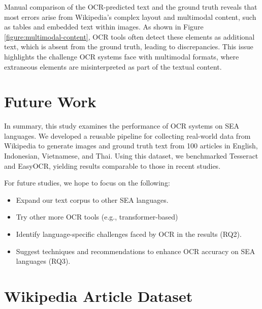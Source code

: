 \documentclass[12pt,oneside]{memoir}
\begin{document}
Manual comparison of the OCR-predicted text and the ground truth reveals that most 
errors arise from Wikipedia’s complex layout and multimodal content, such as 
tables and embedded text within images. As shown in Figure \ref{figure:multimodal-content}, 
OCR tools often detect these elements as additional text, which is absent from 
the ground truth, leading to discrepancies. This issue highlights the challenge 
OCR systems face with multimodal formats, where extraneous elements are 
misinterpreted as part of the textual content.

\chapter{Future Work}
In summary, this study examines the performance of OCR systems on SEA languages. 
We developed a reusable pipeline for collecting real-world data from Wikipedia 
to generate images and ground truth text from 100 articles in English, 
Indonesian, Vietnamese, and Thai. Using this dataset, we benchmarked Tesseract 
and EasyOCR, yielding results comparable to those in recent studies.

For future studies, we hope to focus on the following:

\begin{itemize}
    \item Expand our text corpus to other SEA languages.
    \item Try other more OCR tools (e.g., transformer-based)
    \item Identify language-specific challenges faced by OCR in the results (RQ2).
    \item Suggest techniques and recommendations to enhance OCR accuracy on SEA languages (RQ3).
\end{itemize}

\printbibliography[title={References}]

\clearpage
\appendix
\renewcommand{\chaptername}{Appendix}

\chapter{Wikipedia Article Dataset}
\end{document}
